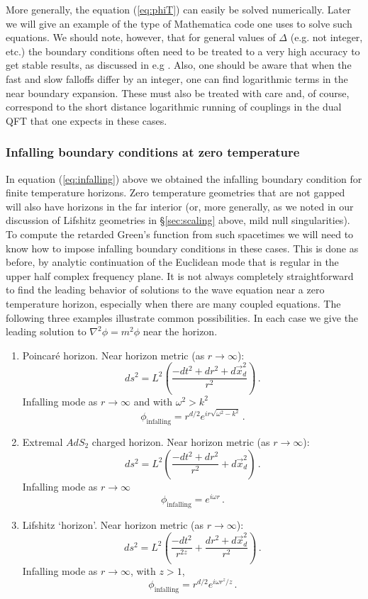 \documentclass[10pt, oneside]{book}
\def\be{\begin{equation}}
\def\ee{\end{equation}}
\begin{document}
\begin{doublespace}
More generally, the equation (\ref{eq:phiT}) can easily be solved numerically. Later we will give an example of the type of Mathematica code one uses to solve such equations. We should note, however, that for general values of $\Delta$ (e.g. not integer, etc.) the boundary conditions often need to be treated to a very high accuracy to get stable results, as discussed in e.g \cite{Denef:2009tp}. Also, one should be aware that when the fast and slow falloffs differ by an integer, one can find logarithmic terms in the near boundary expansion. These must also be treated with care and, of course, correspond to the short distance logarithmic running of couplings in the dual QFT that one expects in these cases.

\subsubsection{Infalling boundary conditions at zero temperature}

In equation (\ref{eq:infalling}) above we obtained the infalling boundary condition for finite temperature horizons. Zero temperature geometries that are not gapped will also have horizons in the far interior (or, more generally, as we noted in our discussion of Lifshitz geometries in \S\ref{sec:scaling} above, mild null singularities). To compute the retarded Green's function from such spacetimes we will need to know how to impose infalling boundary conditions in these cases. This is done as before, by analytic continuation of the Euclidean mode that is regular in the upper half complex frequency plane. It is not always completely straightforward to find the leading behavior of solutions to the wave equation near a zero temperature horizon, especially when there are many coupled equations. The following three examples illustrate common possibilities. In each case we give the leading solution to $\nabla^2 \phi = m^2 \phi$ near the horizon. 
\begin{enumerate}
\item Poincar\'e horizon. Near horizon metric (as $r \to \infty$):
\be
ds^2 = L^2 \left( \frac{-dt^2 + dr^2 + d\vec x^2_d}{r^2} \right) \,.
\ee
Infalling mode as $r \to \infty$ and with $\omega^2 > k^2$
\be
\phi_\text{infalling} = r^{d/2} e^{i r \sqrt{\omega^2 - k^2}} \,.
\ee
\item Extremal $AdS_2$ charged horizon. Near horizon metric (as $r \to \infty$):
\be
ds^2 = L^2 \left( \frac{-dt^2 + dr^2}{r^2}  + d\vec x^2_d \right) \,.
\ee
Infalling mode as $r \to \infty$
\be\label{eq:ads2infall}
\phi_\text{infalling} = e^{i \omega r} \,.
\ee
\item Lifshitz `horizon'. Near horizon metric (as $r \to \infty$):
\be
ds^2 = L^2 \left( \frac{-dt^2}{r^{2z}} + \frac{dr^2  + d\vec x^2_d}{r^2} \right) \,.
\ee
Infalling mode as $r \to \infty$, with $z > 1$,
\be
\phi_\text{infalling} = r^{d/2} e^{i \omega r^z/z} \,.
\ee
\end{enumerate}


\end{doublespace}
\end{document}
